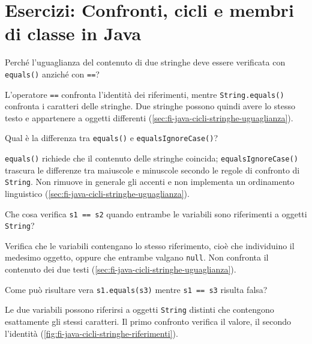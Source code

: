 \chapter{Esercizi: Confronti, cicli e membri di classe in Java}
\label{chap:esercizi-confronti-cicli-java}

\begin{exercise}
\label{ex:fi-esercizi-java-cicli-stringhe-equals}
Perché l'uguaglianza del contenuto di due stringhe deve essere verificata
con \texttt{equals()} anziché con \texttt{==}?
\end{exercise}

L'operatore \texttt{==} confronta l'identità dei riferimenti, mentre
\texttt{String.equals()} confronta i caratteri delle stringhe.
Due stringhe possono quindi avere lo stesso testo e appartenere a
oggetti differenti
(\cref{sec:fi-java-cicli-stringhe-uguaglianza}).

\begin{exercise}
\label{ex:fi-esercizi-java-cicli-ignorecase}
Qual è la differenza tra \texttt{equals()} e
\texttt{equalsIgnoreCase()}?
\end{exercise}

\texttt{equals()} richiede che il contenuto delle stringhe coincida;
\texttt{equalsIgnoreCase()} trascura le differenze tra maiuscole e
minuscole secondo le regole di confronto di \texttt{String}.
Non rimuove in generale gli accenti e non implementa un ordinamento
linguistico
(\cref{sec:fi-java-cicli-stringhe-uguaglianza}).

\begin{exercise}
\label{ex:fi-esercizi-java-cicli-stringhe-uguale-riferimento}
Che cosa verifica \texttt{s1 == s2} quando entrambe le variabili
sono riferimenti a oggetti \texttt{String}?
\end{exercise}

Verifica che le variabili contengano lo stesso riferimento, cioè
che individuino il medesimo oggetto, oppure che entrambe valgano
\texttt{null}. Non confronta il contenuto dei due testi
(\cref{sec:fi-java-cicli-stringhe-uguaglianza}).

\begin{exercise}
\label{ex:fi-esercizi-java-cicli-stringhe-identita-valore}
Come può risultare vera \texttt{s1.equals(s3)} mentre
\texttt{s1 == s3} risulta falsa?
\end{exercise}

Le due variabili possono riferirsi a oggetti \texttt{String}
distinti che contengono esattamente gli stessi caratteri.
Il primo confronto verifica il valore, il secondo l'identità
(\cref{fig:fi-java-cicli-stringhe-riferimenti}).

